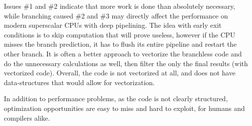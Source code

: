 \documentclass[12pt]{article}
\begin{document}
Issues \#1 and \#2 indicate that more work is done than absolutely necessary, while branching caused \#2 and \#3 may directly affect the performance on modern superscalar CPUs with deep pipelining. The idea with early exit conditions is to skip computation that will prove useless, however if the CPU misses the branch prediction, it has to flush its entire pipeline and restart the other branch. It is often a better approach to vectorize the branchless code and do the unnecessary calculations as well, then filter the only the final results (with vectorized code). Overall, the code is not vectorized at all, and does not have data-structures that would allow for vectorization.

In addition to performance problems, as the code is not clearly structured, optimization opportunities are easy to miss and hard to exploit, for humans and compilers alike.
\end{document}
